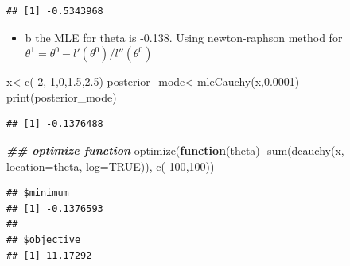 \documentclass[
]{book}
\newenvironment{Shaded}{\begin{snugshade}}{\end{snugshade}}
\newcommand{\AttributeTok}[1]{\textcolor[rgb]{0.77,0.63,0.00}{#1}}
\newcommand{\ConstantTok}[1]{\textcolor[rgb]{0.00,0.00,0.00}{#1}}
\newcommand{\ControlFlowTok}[1]{\textcolor[rgb]{0.13,0.29,0.53}{\textbf{#1}}}
\newcommand{\DecValTok}[1]{\textcolor[rgb]{0.00,0.00,0.81}{#1}}
\newcommand{\DocumentationTok}[1]{\textcolor[rgb]{0.56,0.35,0.01}{\textbf{\textit{#1}}}}
\newcommand{\FloatTok}[1]{\textcolor[rgb]{0.00,0.00,0.81}{#1}}
\newcommand{\FunctionTok}[1]{\textcolor[rgb]{0.00,0.00,0.00}{#1}}
\newcommand{\NormalTok}[1]{#1}
\newcommand{\OtherTok}[1]{\textcolor[rgb]{0.56,0.35,0.01}{#1}}
\newcommand{\SpecialCharTok}[1]{\textcolor[rgb]{0.00,0.00,0.00}{#1}}
\providecommand{\tightlist}{%
  \setlength{\itemsep}{0pt}\setlength{\parskip}{0pt}}
\theoremstyle{definition}
\theoremstyle{definition}
\theoremstyle{definition}
\theoremstyle{definition}
\theoremstyle{remark}
\begin{document}
\begin{verbatim}
## [1] -0.5343968
\end{verbatim}

\begin{itemize}
\tightlist
\item
  b the MLE for theta is -0.138. Using newton-raphson method for \(\theta^{1} = \theta^0 - l'(\theta^0)/l''(\theta^0)\)
\end{itemize}

\begin{Shaded}
\begin{Highlighting}[]
\NormalTok{x}\OtherTok{\textless{}{-}}\FunctionTok{c}\NormalTok{(}\SpecialCharTok{{-}}\DecValTok{2}\NormalTok{,}\SpecialCharTok{{-}}\DecValTok{1}\NormalTok{,}\DecValTok{0}\NormalTok{,}\FloatTok{1.5}\NormalTok{,}\FloatTok{2.5}\NormalTok{)}
\NormalTok{ posterior\_mode}\OtherTok{\textless{}{-}}\FunctionTok{mleCauchy}\NormalTok{(x,}\FloatTok{0.0001}\NormalTok{)}
 \FunctionTok{print}\NormalTok{(posterior\_mode)}
\end{Highlighting}
\end{Shaded}

\begin{verbatim}
## [1] -0.1376488
\end{verbatim}

\begin{Shaded}
\begin{Highlighting}[]
 \DocumentationTok{\#\# optimize function}
 \FunctionTok{optimize}\NormalTok{(}\ControlFlowTok{function}\NormalTok{(theta) }\SpecialCharTok{{-}}\FunctionTok{sum}\NormalTok{(}\FunctionTok{dcauchy}\NormalTok{(x, }\AttributeTok{location=}\NormalTok{theta, }\AttributeTok{log=}\ConstantTok{TRUE}\NormalTok{)),  }\FunctionTok{c}\NormalTok{(}\SpecialCharTok{{-}}\DecValTok{100}\NormalTok{,}\DecValTok{100}\NormalTok{)) }
\end{Highlighting}
\end{Shaded}

\begin{verbatim}
## $minimum
## [1] -0.1376593
## 
## $objective
## [1] 11.17292
\end{verbatim}
\end{document}

